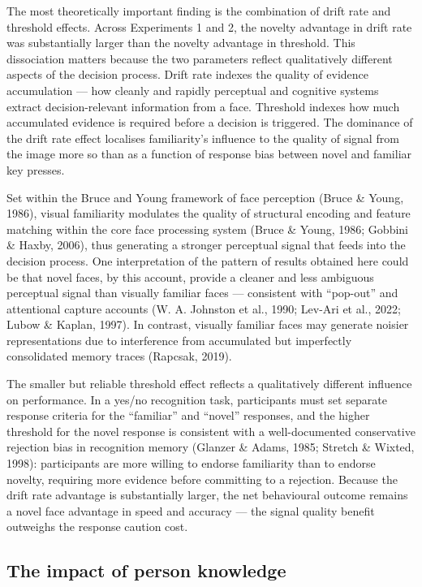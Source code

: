 \documentclass[
  letterpaper,
  DIV=11,
  numbers=noendperiod]{scrartcl}
\begin{document}
The most theoretically important finding is the combination of drift
rate and threshold effects. Across Experiments 1 and 2, the novelty
advantage in drift rate was substantially larger than the novelty
advantage in threshold. This dissociation matters because the two
parameters reflect qualitatively different aspects of the decision
process. Drift rate indexes the quality of evidence accumulation --- how
cleanly and rapidly perceptual and cognitive systems extract
decision-relevant information from a face. Threshold indexes how much
accumulated evidence is required before a decision is triggered. The
dominance of the drift rate effect localises familiarity's influence to
the quality of signal from the image more so than as a function of
response bias between novel and familiar key presses.

Set within the Bruce and Young framework of face perception (Bruce \&
Young, 1986), visual familiarity modulates the quality of structural
encoding and feature matching within the core face processing system
(Bruce \& Young, 1986; Gobbini \& Haxby, 2006), thus generating a
stronger perceptual signal that feeds into the decision process. One
interpretation of the pattern of results obtained here could be that
novel faces, by this account, provide a cleaner and less ambiguous
perceptual signal than visually familiar faces --- consistent with
``pop-out'' and attentional capture accounts (W. A. Johnston et al.,
1990; Lev-Ari et al., 2022; Lubow \& Kaplan, 1997). In contrast,
visually familiar faces may generate noisier representations due to
interference from accumulated but imperfectly consolidated memory traces
(Rapcsak, 2019).

The smaller but reliable threshold effect reflects a qualitatively
different influence on performance. In a yes/no recognition task,
participants must set separate response criteria for the ``familiar''
and ``novel'' responses, and the higher threshold for the novel response
is consistent with a well-documented conservative rejection bias in
recognition memory (Glanzer \& Adams, 1985; Stretch \& Wixted, 1998):
participants are more willing to endorse familiarity than to endorse
novelty, requiring more evidence before committing to a rejection.
Because the drift rate advantage is substantially larger, the net
behavioural outcome remains a novel face advantage in speed and accuracy
--- the signal quality benefit outweighs the response caution cost.

\subsection{The impact of person
knowledge}\label{the-impact-of-person-knowledge}
\end{document}
